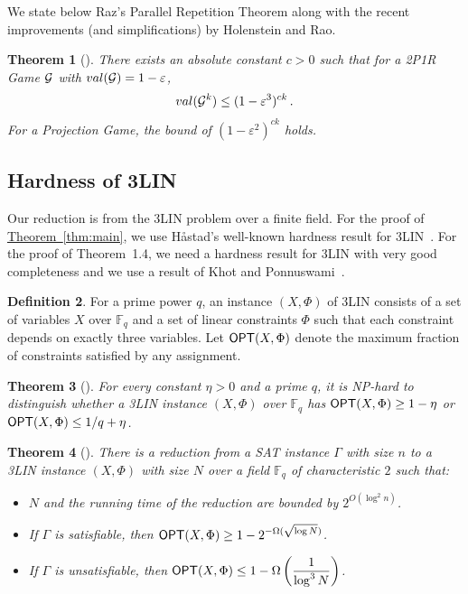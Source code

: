 \documentclass[10pt]{article}
\newtheorem{theorem}{Theorem}[section]
\theoremstyle{definition}
\newtheorem{definition}[theorem]{Definition}
\numberwithin{equation}{section}
\newcommand{\expref}[2]{\texorpdfstring{\hyperref[#2]{#1~\ref{#2}}}{#1~\ref{#2}}}
\newcommand\F{\mathbb{F}}
\DeclareMathOperator\OPT{{\sf OPT}}
\newcommand{\eps}{\varepsilon}
\newcommand{\cclass}[1]{\textsf{#1}}
\begin{document}
We state below Raz's Parallel Repetition Theorem along with the recent
improvements (and simplifications) by Holenstein and Rao.
\begin{theorem}[\cite{Raz, Holenstein, ARao}]\label{thm:pr} 
There exists an absolute constant $c > 0$ such that for a 2P1R
Game ${\cal G}$ with ${\rm val}({\cal G})= 1-\eps$,
 $$ {\rm val}({\cal G}^k) \leq (1-\eps^{3})^{c k}\,. $$
For a Projection Game, the bound of $(1-\eps^{2})^{c k}$ holds.
\end{theorem}

\subsection{Hardness of 3LIN}

Our reduction is from the 3LIN problem over a finite field. For the proof of \expref{Theorem}{thm:main}, we use H\aa stad's well-known hardness result for 3LIN~\cite{Has97}.
For the proof of Theorem~1.4, we need a hardness result for
3LIN with very good completeness and we use a result of Khot and Ponnuswami~\cite{KhotPonnuswami}.

\begin{definition} For a prime power $q$,
an instance $(X, \Phi)$ of 3LIN consists of a set of variables $X$
over $\F_q$ and a set of linear constraints $\Phi$ such that each
constraint depends on exactly three variables. Let $\OPT(X,
\Phi)$ denote the maximum fraction of constraints satisfied by any
assignment.
\end{definition}

\begin{theorem}[\cite{Has97}]\label{thm:Has97} 
For every constant $\eta > 0$ and a prime $q$, it is
\cclass{NP}-hard to distinguish whether a 3LIN instance $(X, \Phi)$ over
$\F_q$ has $\OPT(X,\Phi) \geq 1-\eta$ or $\OPT(X,\Phi)
\leq {1}/{q}+\eta$.
\end{theorem}

\begin{theorem}[\cite{KhotPonnuswami}]\label{thm:kp} 
There is a reduction from a SAT instance $\Gamma$
with size $n$ to a 3LIN instance $(X,\Phi)$ with size $N$ over a field $\F_q$ of characteristic $2$
such that: \begin{itemize}
\item $N$ and the running time of the reduction are bounded by $2^{O(\log^2 n)}$.
\item If $\Gamma$ is satisfiable, then $\displaystyle\OPT(X, \Phi) \geq
1- 2^{-\Omega(\sqrt{\log N})}$.
\item If $\Gamma$ is unsatisfiable, then $\displaystyle\OPT(X, \Phi) \leq
1- \Omega\left( \frac{1}{\log^3 N}  \right)$.
\end{itemize}
\end{theorem}
\end{document}
